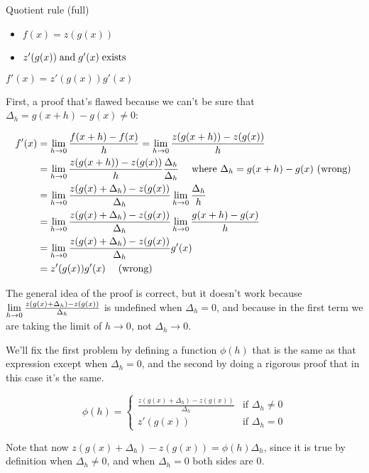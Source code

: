 \begin{property}{Quotient rule (full)}
\begin{precondition}
    \begin{itemize}
      \item $f(x)=z(g(x))$
      \item $z'(g(x)) \; \text{and} \; g'(x) \; \text{exists} \;$
    \end{itemize}
  \end{precondition}
\begin{claim}
    $f'(x)= z'(g(x)) g'(x)$
\end{claim}
\begin{Proof}

\newcommand{\dgh}{\Delta_h}
First, a proof that's flawed because we can't be sure that $\dgh=g(x+h)-g(x) \neq 0$:

\begin{align*}
f'(x)&=\derDefinition = \derLimit{z(g(x+h)) - z(g(x))}{h}
\\ &= \derLimit{z(g(x+h)) - z(g(x))}{h}  \frac{\dgh}{\dgh} \mathcomment{where $\dgh=g(x+h)-g(x)$ (wrong)}
\\ &= \derLimit{z(g(x)+\dgh) - z(g(x))}{\dgh}  \derLimit{\dgh}{h}
\\ &= \derLimit{z(g(x)+\dgh) - z(g(x))}{\dgh}  \derLimit{g(x+h)-g(x)}{h}
\\ &= \derLimit{z(g(x)+\dgh) - z(g(x))}{\dgh}  g'(x)
\\ &= z'(g(x))  g'(x) \mathcomment{(wrong)}
\end{align*}

The general idea of the proof is correct, but it doesn't work because $\derLimit{z(g(x)+\dgh) - z(g(x))}{\dgh}$ is undefined when $\dgh=0$, and because in the first term we are taking the limit of $h \rightarrow 0$, not $\dgh \rightarrow 0$.

We'll fix the first problem by defining a function $ϕ(h)$ that is the same as that expression except when $\dgh=0$, and the second by doing a rigorous proof that in this case it's the same.

\begin{equation*}
ϕ(h)=
\begin{cases}
\frac{z(g(x)+\dgh) - z(g(x))}{\dgh}  &\mbox{if } \dgh \neq 0 \\
z'(g(x))                                 &\mbox{if } \dgh = 0
\end{cases}
\end{equation*}

Note that now $z(g(x)+\dgh) - z(g(x)) = ϕ(h) \dgh$, since it is true by definition when $\dgh \neq 0$, and when $\dgh=0$ both sides are $0$.


\end{Proof}
\end{property}
